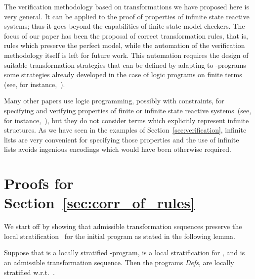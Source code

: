 \documentclass[english]{tlp}
\begin{document}
The verification methodology based on transformations we have 
proposed here is very general. It can be applied to the proof 
of properties of infinite state reactive systems; thus it goes 
beyond the capabilities of finite state model checkers.
The focus of our paper has been the proposal of correct 
transformation rules, that is, rules which preserve the
perfect model, while the automation of the verification 
methodology itself is 
left for future work.
This automation 
requires the design of suitable transformation strategies that can be 
defined by adapting to -programs some strategies 
already developed in the case of logic programs on finite 
terms (see, for instance,~\cite{PrP95a,PeP00a}).

Many other papers use logic programming, possibly with constraints,
for specifying and verifying properties of finite or infinite state 
reactive systems~(see, 
for instance,~\cite{AbM89,DeP01,FrO97a,Ja&04,LeM99,NiL00,Ra&97}), but 
they do not consider terms which explicitly represent infinite
structures. As we have seen in the examples of Section~\ref{sec:verification}, 
infinite lists are very convenient for specifying those properties
and the use of infinite lists avoids
 ingenious encodings which would have been otherwise required.







\newpage

\appendix

\section{Proofs for Section~\ref{sec:corr_of_rules}}
\label{appendix:corr_of_rules}

We start off by showing that admissible transformation sequences
preserve the local stratification~ for the initial
program  as stated in the following lemma.

\medskip


\noindent Suppose that  is a locally stratified
-program,  is a local stratification for , and
  is an admissible transformation sequence. Then
the programs {\it{Defs}}, 
are locally stratified
w.r.t.~.
\end{document}
